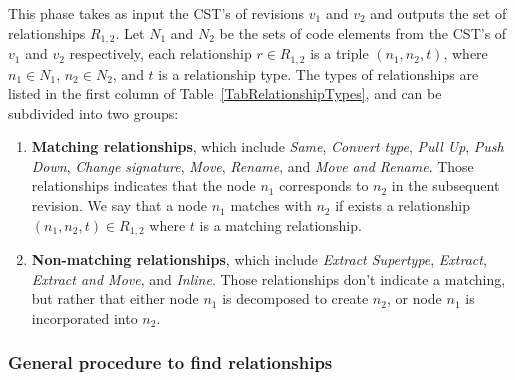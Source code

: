 This phase takes as input the CST's of revisions $v_1$ and $v_2$ and outputs the set of relationships $R_{1,2}$. Let $N_1$ and $N_2$ be the sets of code elements from the CST's of $v_1$ and $v_2$ respectively, each relationship $r \in R_{1,2}$ is a triple $(n_1, n_2, t)$, where $n_1 \in N_1$, $n_2 \in N_2$, and $t$ is a relationship type. The types of relationships are listed in the first column of Table~\ref{TabRelationshipTypes}, and can be subdivided into two groups:
\begin{enumerate}
\item \textbf{Matching relationships}, which include \textit{Same}, \textit{Convert type}, \textit{Pull Up}, \textit{Push Down}, \textit{Change signature}, \textit{Move}, \textit{Rename}, and \textit{Move and Rename}.
Those relationships indicates that the node $n_1$ corresponds to $n_2$ in the subsequent revision.
We say that a node $n_1$ matches with $n_2$ if exists a relationship $(n_1, n_2, t) \in R_{1,2}$ where $t$ is a matching relationship.

\item \textbf{Non-matching relationships}, which include \textit{Extract Supertype}, \textit{Extract}, \textit{Extract and Move}, and \textit{Inline}.
Those relationships don't indicate a matching, but rather that either node $n_1$ is decomposed to create $n_2$, or node $n_1$ is incorporated into $n_2$.
\end{enumerate}


\subsubsection{General procedure to find relationships}

